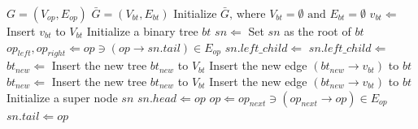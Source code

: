 \begin{algorithm}[ht!]    \caption{}
    \begin{algorithmic}[1]
        \Require    $G = ( V_{op} , E_{op} )$ 
        \Ensure     $\bar{G} = ( V_{bt} , E_{bt} )$ 
        \State      Initialize $\bar{G} \textrm{, where } V_{bt} = \emptyset \textrm{ and } E_{bt} = \emptyset $
          \label{line:forroots}   
        \State      $v_{bt} \Leftarrow $
        \State      Insert $v_{bt}$ to $V_{bt}$
        \EndFor                                                                    \label{line:forroote}
        \Statex %
                 \label{line:bbts}
        \State      Initialize a binary tree $bt$
        \State      $sn \Leftarrow$ 
        \State      Set $sn$ as the root of $bt$
        \State      {}
        \State      {}
        \EndFunction                                \label{line:bbte}
        \Statex %
                  \label{line:gbts}
             
        \State      $op_{left}, op_{right} \Leftarrow op \ni (op \rightarrow sn.tail) \in E_{op}$ 
          \label{line:deg}  \label{line:growifs}
        \State      $sn.left\_child \Leftarrow$ 
        \State      {}
        \State      $sn.left\_child \Leftarrow$ 
        \State      {}     \label{line:growife}
        \Else       \label{line:growelses}
        \State      $bt_{new} \Leftarrow$ 
        \State      Insert the new tree $bt_{new}$ to $V_{bt}$
        \State      Insert the new edge $(bt_{new} \rightarrow v_{bt})$ to $bt$
        \State      $bt_{new} \Leftarrow$ 
        \State      Insert the new tree $bt_{new}$ to $V_{bt}$
        \State      Insert the new edge $(bt_{new} \rightarrow v_{bt})$ to $bt$ \label{line:growelsee}
        \EndIf                          \label{line:gbte}
        \EndIf
        \EndFunction
        \Statex %
          \label{line:bsns}
        \State  Initialize a super node $sn$ 
        \State  $sn.head \Leftarrow op$
        \State   $op \Leftarrow op_{next} \ni (op_{next} \rightarrow op) \in E_{op}$ 
        \EndWhile
        \State  $sn.tail \Leftarrow op$
        \State      {}
        \EndFunction                        \label{line:bsne}
    \end{algorithmic}
    \label{alg:tohdfg}
\end{algorithm}
